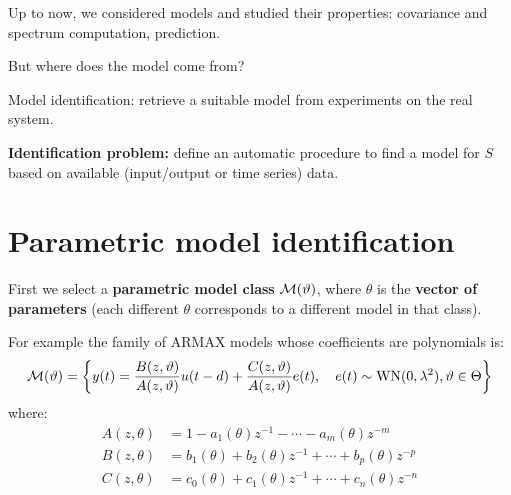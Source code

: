 Up to now, we considered models and studied their properties: covariance and spectrum computation, prediction.

But where does the model come from?

Model identification: retrieve a suitable model from experiments on the real system.


\textbf{Identification problem:} define an automatic procedure to find a model for $S$ based on available (input/output or time series) data.





\section{Parametric model identification}

First we select a \textbf{parametric model class} $\mathcal{M}(\vartheta)$, where $\theta$ is the \textbf{vector of parameters} (each different $\theta$ corresponds to a different model in that class).

For example the family of ARMAX models whose coefficients are polynomials is:
$$
	\mathcal{M}(\vartheta)=\left\{y(t)=\frac{B(z, \vartheta)}{A(z, \vartheta)} u(t-d)+\frac{C(z, \vartheta)}{A(z, \vartheta)} e(t), \quad e(t) \sim \operatorname{WN}(0, \lambda^{2}), \vartheta\in\Theta\right\}
$$
where:
\begin{align*}
	A(z, \theta)&=1-a_{1}(\theta) z^{-1}-\cdots-a_{m}(\theta) z^{-m} \\
	B(z, \theta)&=b_{1}(\theta)+b_{2}(\theta) z^{-1}+\cdots+b_{p}(\theta) z^{-p}\\
	C(z, \theta)&=c_0(\theta)+c_{1}(\theta) z^{-1}+\cdots+c_{n}(\theta) z^{-n}
\end{align*}

